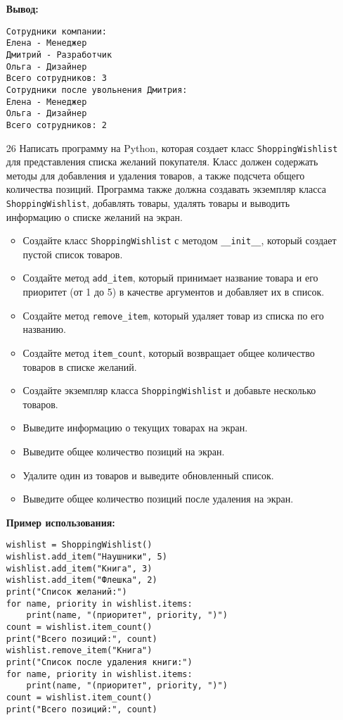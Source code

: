 \begin{enumerate}
\textbf{Вывод:}
\begin{verbatim}
Сотрудники компании:
Елена - Менеджер
Дмитрий - Разработчик
Ольга - Дизайнер
Всего сотрудников: 3
Сотрудники после увольнения Дмитрия:
Елена - Менеджер
Ольга - Дизайнер
Всего сотрудников: 2
\end{verbatim}

\item[26] Написать программу на Python, которая создает класс \texttt{ShoppingWishlist} для представления списка желаний покупателя. Класс должен содержать методы для добавления и удаления товаров, а также подсчета общего количества позиций. Программа также должна создавать экземпляр класса \texttt{ShoppingWishlist}, добавлять товары, удалять товары и выводить информацию о списке желаний на экран.

\begin{itemize}
    \item Создайте класс \texttt{ShoppingWishlist} с методом \texttt{\_\_init\_\_}, который создает пустой список товаров.
    \item Создайте метод \texttt{add\_item}, который принимает название товара и его приоритет (от 1 до 5) в качестве аргументов и добавляет их в список.
    \item Создайте метод \texttt{remove\_item}, который удаляет товар из списка по его названию.
    \item Создайте метод \texttt{item\_count}, который возвращает общее количество товаров в списке желаний.
    \item Создайте экземпляр класса \texttt{ShoppingWishlist} и добавьте несколько товаров.
    \item Выведите информацию о текущих товарах на экран.
    \item Выведите общее количество позиций на экран.
    \item Удалите один из товаров и выведите обновленный список.
    \item Выведите общее количество позиций после удаления на экран.
\end{itemize}

\textbf{Пример использования:}

\begin{verbatim}
wishlist = ShoppingWishlist()
wishlist.add_item("Наушники", 5)
wishlist.add_item("Книга", 3)
wishlist.add_item("Флешка", 2)
print("Список желаний:")
for name, priority in wishlist.items:
    print(name, "(приоритет", priority, ")")
count = wishlist.item_count()
print("Всего позиций:", count)
wishlist.remove_item("Книга")
print("Список после удаления книги:")
for name, priority in wishlist.items:
    print(name, "(приоритет", priority, ")")
count = wishlist.item_count()
print("Всего позиций:", count)
\end{verbatim}


\end{enumerate}
